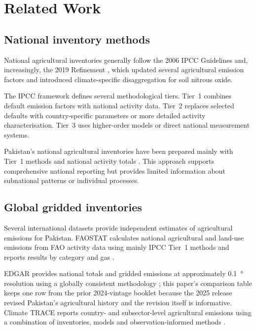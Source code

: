 \section{Related Work}
\label{sec:related_work}

\subsection{National inventory methods}

National agricultural inventories generally follow the 2006 IPCC Guidelines
\citep{ipcc2006} and, increasingly, the 2019 Refinement \citep{ipcc2019}, which updated
several agricultural emission factors and introduced climate-specific disaggregation for
soil nitrous oxide.

The IPCC framework defines several methodological tiers. Tier~1 combines default emission
factors with national activity data. Tier~2 replaces selected defaults with
country-specific parameters or more detailed activity characterisation. Tier~3 uses
higher-order models or direct national measurement systems.

Pakistan's national agricultural inventories have been prepared mainly with Tier~1 methods
and national activity totals \citep{gcisc,mir2022}. This approach supports comprehensive
national reporting but provides limited information about subnational patterns or
individual processes.

\subsection{Global gridded inventories}

Several international datasets provide independent estimates of agricultural emissions for
Pakistan. FAOSTAT calculates national agricultural and land-use emissions from FAO activity
data using mainly IPCC Tier~1 methods and reports results by category and gas
\citep{faostat,tubiello2013}.

EDGAR provides national totals and gridded emissions at approximately \SI{0.1}{\degree}
resolution using a globally consistent methodology \citep{edgar2025booklet,crippa2020};
this paper's comparison table keeps one row from the prior 2024-vintage booklet
\citep{edgar2024} because the 2025 release revised Pakistan's agricultural
\CHfour{} history and the revision itself is informative. Climate
TRACE reports country- and subsector-level agricultural emissions using a combination of
inventories, models and observation-informed methods \citep{climatetrace}.

